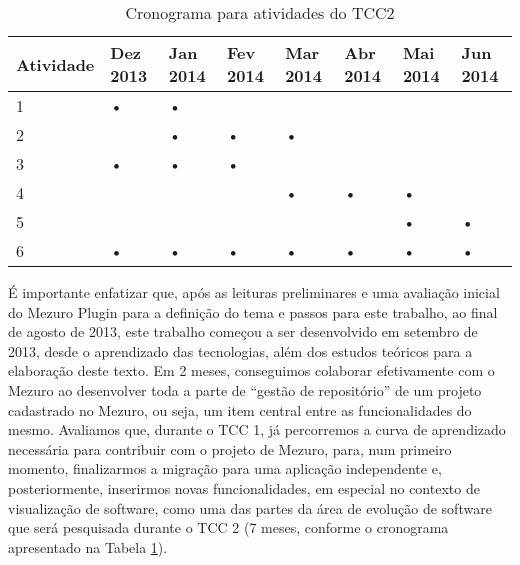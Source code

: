 \begin{table}[H]
\begin{center}
    \begin{tabular}{ | l | l | l | l | l | l | l | l |}
    \hline
    Atividade & Dez 2013 & Jan 2014 & Fev 2014 & Mar 2014 & Abr 2014 & Mai 2014 & Jun 2014 \\ \hline
    1 & • & • &   &   &   &   &   \\ \hline
    2 &   & • & • & • &   &   &   \\ \hline
    3 & • & • & • &   &   &   &   \\ \hline
    4 &   &   &   & • & • & • &   \\ \hline
    5 &   &   &   &   &   & • & • \\ \hline
    6 & • & • & • & • & • & • & • \\ \hline
    \end{tabular}
    \caption{Cronograma para atividades do TCC2}
    \label{tab-cronograma}
\end{center}
\end{table}

É importante enfatizar que, após as leituras preliminares e uma avaliação inicial do Mezuro Plugin para a definição do tema e passos para este trabalho, ao final de agosto de 2013, este trabalho começou a ser desenvolvido em setembro de 2013, desde o aprendizado das tecnologias, além dos estudos teóricos para a elaboração deste texto.
%
Em 2 meses, conseguimos colaborar efetivamente com o Mezuro ao desenvolver toda a parte de ``gestão de repositório'' de um projeto cadastrado no Mezuro, ou seja, um item central entre as funcionalidades do mesmo.
%
Avaliamos que, durante o TCC 1, já percorremos a curva de aprendizado necessária para contribuir com o projeto de Mezuro, para, num primeiro momento, finalizarmos a migração para uma aplicação independente e, posteriormente, inserirmos novas funcionalidades, em especial no contexto de visualização de software, como uma das partes da área de evolução de software que será pesquisada durante o TCC 2 (7 meses, conforme o cronograma apresentado na Tabela \ref{tab-cronograma}).



